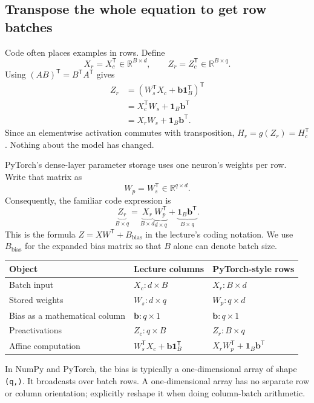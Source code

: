\subsection{Transpose the whole equation to get row batches}
Code often places examples in rows. Define
\[
 X_r=X_c^{\mathsf T}\in\mathbb{R}^{B\times d},\qquad
 Z_r=Z_c^{\mathsf T}\in\mathbb{R}^{B\times q}.
\]
Using $(AB)^{\mathsf T}=B^{\mathsf T}A^{\mathsf T}$ gives
\begin{align}
 Z_r
 &=\left(W_s^{\mathsf T}X_c+\mathbf{b}\mathbf{1}_B^{\mathsf T}\right)^{\mathsf T}\\
 &=X_c^{\mathsf T}W_s+\mathbf{1}_B\mathbf{b}^{\mathsf T}\\
 &=X_rW_s+\mathbf{1}_B\mathbf{b}^{\mathsf T}.
\end{align}
Since an elementwise activation commutes with transposition,
$H_r=g(Z_r)=H_c^{\mathsf T}$. Nothing about the model has changed.

PyTorch's dense-layer parameter storage uses one neuron's weights per row. Write that matrix as
\[
 W_p=W_s^{\mathsf T}\in\mathbb{R}^{q\times d}.
\]
Consequently, the familiar code expression is
\begin{equation}
 \boxed{\underbrace{Z_r}_{B\times q}
 =\underbrace{X_r}_{B\times d}
  \underbrace{W_p^{\mathsf T}}_{d\times q}
  +\underbrace{\mathbf{1}_B\mathbf{b}^{\mathsf T}}_{B\times q}.}
\end{equation}
This is the formula $Z=XW^{\mathsf T}+B_{\mathrm{bias}}$ in the lecture's coding notation. We use $B_{\mathrm{bias}}$ for the expanded bias matrix so that $B$ alone can denote batch size.

\begin{center}
\begin{tabular}{lll}
\toprule
Object & Lecture columns & PyTorch-style rows\\
\midrule
Batch input & $X_c:d\times B$ & $X_r:B\times d$\\
Stored weights & $W_s:d\times q$ & $W_p:q\times d$\\
Bias as a mathematical column & $\mathbf{b}:q\times1$ & $\mathbf{b}:q\times1$\\
Preactivations & $Z_c:q\times B$ & $Z_r:B\times q$\\
Affine computation & $W_s^{\mathsf T}X_c+\mathbf{b}\mathbf1_B^{\mathsf T}$ & $X_rW_p^{\mathsf T}+\mathbf1_B\mathbf{b}^{\mathsf T}$\\
\bottomrule
\end{tabular}
\end{center}
In NumPy and PyTorch, the bias is typically a one-dimensional array of shape \texttt{(q,)}. It broadcasts over batch rows. A one-dimensional array has no separate row or column orientation; explicitly reshape it when doing column-batch arithmetic.

